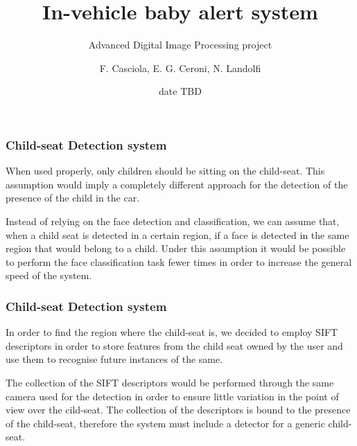 \documentclass{beamer}
\title{In-vehicle baby alert system}
\subtitle{Advanced Digital Image Processing project}
\author{F. Casciola, E. G. Ceroni, N. Landolfi} %
\institute[Unisi]{Università degli Studi di Siena}
\date{date TBD}
\begin{document}
	
	
	\begin{frame}
		\frametitle{Child-seat Detection system}
		When used properly, only children should be sitting on the child-seat. This assumption would imply a completely different approach for the detection of the presence of the child in the car. 
		
\bigskip		
		Instead of relying on the face detection and classification, we can assume that, when a child seat is detected in a certain region, if a face is detected in the same region that would belong to a child. Under this assumption it would be possible to perform the face classification task fewer times in order to increase the general speed of  the system.
		
	\end{frame}	
	
	\begin{frame}
		\frametitle{Child-seat Detection system}

		In order to find the region where the child-seat is, we decided to employ SIFT descriptors in order to store features from the child seat owned by the user and use them to recognise future instances of the same. 
		
		\bigskip
		The collection of the SIFT descriptors would be performed through the same camera used for the detection in order to ensure little variation in the point of view over the cild-seat. The collection of the descriptors is bound to the presence of the child-seat, therefore the system must include a detector for a generic child-seat. 
		
	\end{frame}	
	
\end{document}
